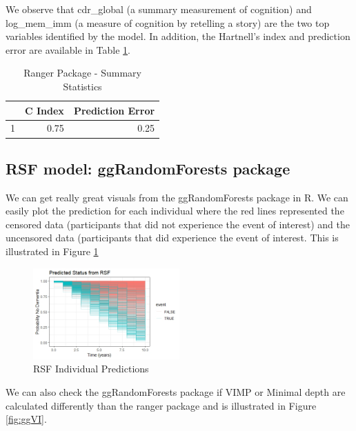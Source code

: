\documentclass[a4paper,man,natbib,11pt]{article}
\begin{document}
We observe that cdr\_global (a summary measurement of cognition) and log\_mem\_imm (a measure of cognition by retelling a story) are the two top variables identified by the model. In addition, the Hartnell's index and prediction error are available in Table \ref{ranger_stat}.

\begin{table}[ht]
\centering
\caption{Ranger Package - Summary Statistics}
\begin{tabular}{rrr}
  \hline
 & C Index & Prediction Error \\ 
  \hline
1 & 0.75 & 0.25 \\ 
   \hline
\end{tabular}
\label{ranger_stat}
\end{table}

\subsection{RSF model: ggRandomForests package}

We can get really great visuals from the ggRandomForests package in R. We can easily plot the prediction for each individual where the red lines represented the censored data (participants that did not experience the event of interest) and the uncensored data (participants that did experience the event of interest. This is illustrated in Figure \ref{fig:RSF_pred} 

\begin{figure}[h!]%
    \centering
    \includegraphics[width=0.5\textwidth]{figures/Predicted_Individual_RSF.jpeg}
    \caption{RSF Individual Predictions}%
    \label{fig:RSF_pred}%
\end{figure}

We can also check the ggRandomForests package if VIMP or Minimal depth are calculated differently than the ranger package and is illustrated in Figure \ref{fig:ggVI}. 
\end{document}

